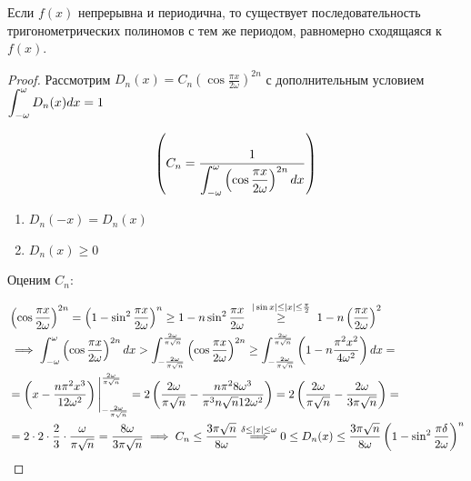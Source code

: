 \begin{theorem}
    Если $f(x)$ непрерывна и периодична, то существует последовательность
    тригонометрических полиномов с тем же периодом, равномерно сходящаяся
    к $f(x)$.
\end{theorem}
\begin{proof}
    Рассмотрим $D_n(x) = C_n(\cos \frac{\pi x}{2 \omega})^{2n}$ с дополнительным
    условием $\displaystyle\int_{-\omega}^\omega D_n(x) dx = 1$

    \[ \left(C_n = \frac{1}{\displaystyle\int_{-\omega}^\omega \left(\cos \frac{\pi x}{2 \omega}\right)^{2n} dx}\right) \]

    \begin{enumerate}
        \item $D_n(-x) = D_n(x)$
        \item $D_n(x) \geq 0$
    \end{enumerate}

    Оценим $C_n$:

    \begin{align*}
        &\left(\cos \frac{\pi x}{2 \omega}\right)^{2n} = 
        \left(1 - \sin^2 \frac{\pi x}{2 \omega}\right)^n \geq
        1 - n \sin^2 \frac{\pi x}{2 \omega} \;
        \stackrel{|\sin x| \leq |x| \leq \frac{\pi}{2}}{\geq} \;
        1 - n \left(\frac{\pi x}{2 \omega}\right)^2 \\
        &\implies \displaystyle\int_{-\omega}^\omega \left(\cos \frac{\pi x}{2 \omega}\right)^{2n} dx >
        \displaystyle\int_{-\frac{2 \omega}{\pi \sqrt{n}}}^{\frac{2 \omega}{\pi \sqrt{n}}} \left(\cos \frac{\pi x}{2 \omega}\right)^{2n} \geq
        \displaystyle\int_{-\frac{2 \omega}{\pi \sqrt{n}}}^{\frac{2 \omega}{\pi \sqrt{n}}} \left( 1 - n \frac{\pi^2 x^2}{4 \omega^2} \right) dx = \\
        &= \left( x - \frac{n \pi^2 x^3}{12 \omega^2} \right) \Bigg|_{-\frac{2 \omega}{\pi \sqrt{n}}}^{\frac{2 \omega}{\pi \sqrt{n}}} =
        2 \left( \frac{2 \omega}{\pi \sqrt{n}} - \frac{n \pi^2 8 \omega^3}{\pi^3 n \sqrt{n} 12 \omega^2} \right) =
        2 \left( \frac{2 \omega}{\pi \sqrt{n}} - \frac{2 \omega}{3 \pi \sqrt{n}} \right) = \\
        &= 2 \cdot 2 \cdot \frac{2}{3} \cdot \frac{\omega}{\pi \sqrt{n}} = \frac{8 \omega}{3 \pi \sqrt{n}}
        \implies C_n \leq \frac{3 \pi \sqrt{n}}{8 \omega} 
        \stackrel{\delta \leq |x| \leq \omega}{\implies} 0 \leq D_n(x) \leq \frac{3 \pi \sqrt{n}}{8 \omega} \left(1 - \sin^2 \frac{\pi \delta}{2 \omega}\right)^n
    \end{align*}


\end{proof}
